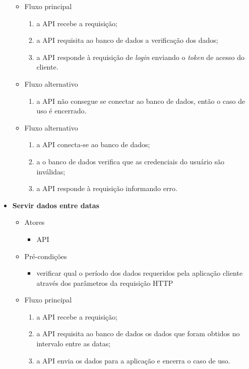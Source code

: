 \begin{itemize}
\begin{itemize}
		    \item Fluxo principal
			    \begin{enumerate}
			    	\item a API recebe a requisição;
			        \item a API requisita ao banco de dados a verificação dos dados;			
			        \item a API responde à requisição de \textit{login} enviando o \textit{token} de acesso do cliente.			     
			    \end{enumerate}

			\item Fluxo alternativo
			    \begin{enumerate}
			        \item a API não consegue se conectar ao banco de dados, então o caso de uso é encerrado.
			    \end{enumerate}
    
		    \item Fluxo alternativo
			    \begin{enumerate}
			        \item a API conecta-se ao banco de dados;
	        		\item a o banco de dados verifica que as credenciais do usuário são inválidas;
			        \item a API responde à requisição informando erro.
			    \end{enumerate}
		\end{itemize}
		
	\item \textbf{Servir dados entre datas}

		\begin{itemize}
    		\item Atores
			    \begin{itemize}
    	    		\item API
			    \end{itemize}

		    \item Pré-condições
			    \begin{itemize}
     		   		\item verificar qual o período dos dados requeridos pela aplicação cliente através dos parâmetros da requisição HTTP
			    \end{itemize}

			\item Fluxo principal
   	 			\begin{enumerate}
		     	   \item a API recebe a requisição;
			        \item a API requisita ao banco de dados os dados que foram obtidos no intervalo entre as datas;
		    	    \item a API envia os dados para a aplicação e encerra o caso de uso.
		   		 \end{enumerate}


\end{itemize}
\end{itemize}
